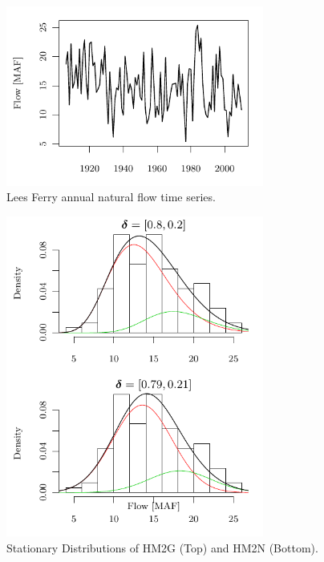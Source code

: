 \documentclass[wrr]{AGUTeX}
\begin{document}
\begin{figure}
\centering
\noindent\includegraphics[width=20pc]{plots/hmm-sim-figure0.pdf} 
\caption{Lees Ferry annual natural flow time series.}\label{fig:lfts}
\end{figure}

\begin{figure}
\centering
\noindent\includegraphics[width=20pc]{plots/hmm-sim-figure1.pdf}
\caption{Stationary Distributions of HM2G (Top) and HM2N (Bottom).}\label{fig:statdist}
\end{figure}
\end{document}
